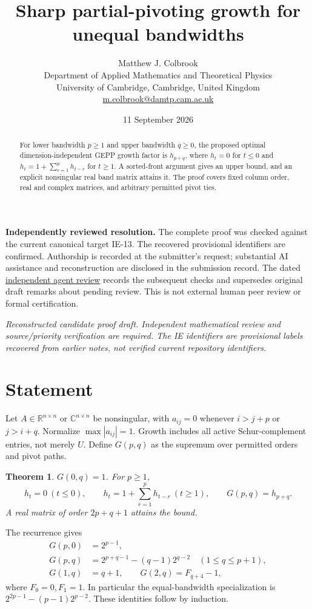 \documentclass[11pt]{article}
\title{Sharp partial-pivoting growth for unequal bandwidths}
\author{Matthew J. Colbrook\\\small Department of Applied Mathematics and Theoretical Physics\\\small University of Cambridge, Cambridge, United Kingdom\\\small\href{mailto:m.colbrook@damtp.cam.ac.uk}{m.colbrook@damtp.cam.ac.uk}}
\date{11 September 2026}
\newtheorem{theorem}{Theorem}
\newcommand{\R}{\mathbb R}
\newcommand{\C}{\mathbb C}
\begin{document}
\maketitle

\noindent\textbf{Independently reviewed resolution.} The complete proof was checked against the current canonical target IE-13. The recovered provisional identifiers are confirmed. Authorship is recorded at the submitter's request; substantial AI assistance and reconstruction are disclosed in the submission record.
The dated \href{https://github.com/MColbrook/OpenProblemsInNLA/blob/codex/colbrook-recovered-submissions/references/colbrook-recovered-2026-09-11/verification/reviews/IE-13-review.md}{independent agent review} records the subsequent checks and supersedes original draft remarks about pending review. This is not external human peer review or formal certification.
\par\medskip

\noindent\textit{Reconstructed candidate proof draft. Independent mathematical review and source/priority verification are required. The IE identifiers are provisional labels recovered from earlier notes, not verified current repository identifiers.}


\begin{abstract}
For lower bandwidth $p\ge1$ and upper bandwidth $q\ge0$, the proposed optimal dimension-independent GEPP growth factor is $h_{p+q}$, where $h_t=0$ for $t\le0$ and $h_t=1+\sum_{r=1}^p h_{t-r}$ for $t\ge1$. A sorted-front argument gives an upper bound, and an explicit nonsingular real band matrix attains it. The proof covers fixed column order, real and complex matrices, and arbitrary permitted pivot ties.
\end{abstract}
\section{Statement}
Let $A\in\R^{n\times n}$ or $\C^{n\times n}$ be nonsingular, with $a_{ij}=0$ whenever $i>j+p$ or $j>i+q$. Normalize $\max|a_{ij}|=1$. Growth includes all active Schur-complement entries, not merely $U$. Define $G(p,q)$ as the supremum over permitted orders and pivot paths.
\begin{theorem}
$G(0,q)=1$. For $p\ge1$,
\[
 h_t=0\ (t\le0),\qquad h_t=1+\sum_{r=1}^p h_{t-r}\ (t\ge1),\qquad
 \boxed{G(p,q)=h_{p+q}.}
\]
A real matrix of order $2p+q+1$ attains the bound.
\end{theorem}
The recurrence gives
\begin{align*}
G(p,0)&=2^{p-1},\\
G(p,q)&=2^{p+q-1}-(q-1)2^{q-2}\quad(1\le q\le p+1),\\
G(1,q)&=q+1,\qquad G(2,q)=F_{q+4}-1,
\end{align*}
where $F_0=0,F_1=1$. In particular the equal-bandwidth specialization is $2^{2p-1}-(p-1)2^{p-2}$. These identities follow by induction.
\end{document}

